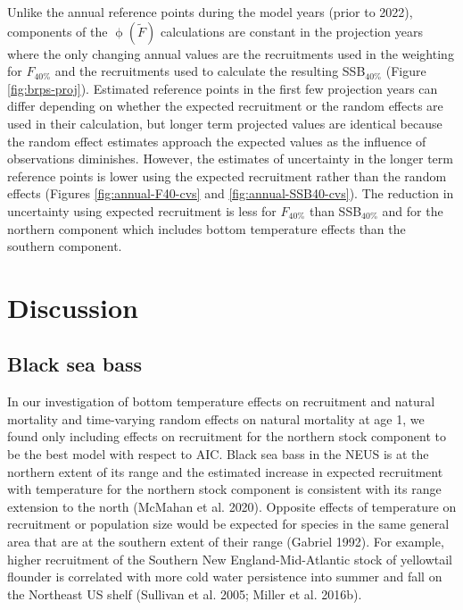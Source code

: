 \documentclass[
]{article}
\begin{document}
Unlike the annual reference points during the model years (prior to 2022), components of the \(\upphi(\widetilde{F})\) calculations are constant in the projection years where the only changing annual values are the recruitments used in the weighting for \(F_{40\%}\) and the recruitments used to calculate the resulting SSB\(_{40\%}\) (Figure \ref{fig:brps-proj}). Estimated reference points in the first few projection years can differ depending on whether the expected recruitment or the random effects are used in their calculation, but longer term projected values are identical because the random effect estimates approach the expected values as the influence of observations diminishes. However, the estimates of uncertainty in the longer term reference points is lower using the expected recruitment rather than the random effects (Figures \ref{fig:annual-F40-cvs} and \ref{fig:annual-SSB40-cvs}). The reduction in uncertainty using expected recruitment is less for \(F_{40\%}\) than SSB\(_{40\%}\) and for the northern component which includes bottom temperature effects than the southern component.

\hypertarget{discussion}{%
\section*{Discussion}\label{discussion}}

\hypertarget{black-sea-bass}{%
\subsection*{Black sea bass}\label{black-sea-bass}}

In our investigation of bottom temperature effects on recruitment and natural mortality and time-varying random effects on natural mortality at age 1, we found only including effects on recruitment for the northern stock component to be the best model with respect to AIC. Black sea bass in the NEUS is at the northern extent of its range and the estimated increase in expected recruitment with temperature for the northern stock component is consistent with its range extension to the north (McMahan et al. 2020). Opposite effects of temperature on recruitment or population size would be expected for species in the same general area that are at the southern extent of their range (Gabriel 1992). For example, higher recruitment of the Southern New England-Mid-Atlantic stock of yellowtail flounder is correlated with more cold water persistence into summer and fall on the Northeast US shelf (Sullivan et al. 2005; Miller et al. 2016b).
\end{document}
